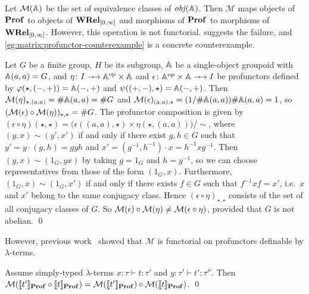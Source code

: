 Let \( \mathcal{M}(\mathbb{A}) \) be the set of equivalence classes of \( \mathit{obj}(\mathbb{A}) \). 
Then \( \mathcal{M} \) maps objects of \( \mathbf{Prof} \) to objects of \( \mathbf{WRel}_{[0,\infty]} \) and morphisms of \( \mathbf{Prof} \) to morphisms of \( \mathbf{WRel}_{[0,\infty]} \).
However, this operation is not functorial.
 suggests the failure, and \cref{eg:matrix:profunctor-counterexample} is a concrete counterexample.


\newcommand{\TerminalCategory}{I}
\begin{example}\label{eg:matrix:profunctor-counterexample}
    Let \( G \) be a finite group, \( H \) be its subgroup, \( \mathbb{A} \) be a single-object groupoid with \( \mathbb{A}(a, a) = G \), and \( \eta \colon \TerminalCategory \profarrow \Grp^{\op} \times \Grp \) and \( \epsilon \colon \Grp^{\op} \times \Grp \profarrow \TerminalCategory \) be profunctors defined by \( \varphi(\star, ({-}, {+})) = \mathbb{A}({-}, {+}) \) and \( \psi(({+}, {-}), \star) = \mathbb{A}({-}, {+}) \).
    Then \( \mathcal{M}({\eta})_{\star, (a,a)} = \#\mathbb{A}(a,a) = \#G \) and \( \mathcal{M}({\epsilon})_{(a,a), \star} = (1/\#\mathbb{A}(a,a))\#\mathbb{A}(a,a) = 1 \), so \( (\mathcal{M}({\epsilon}) \circ \mathcal{M}({\eta}))_{\star, \star} = \#G \).
    The profunctor composition is given by \( (\epsilon \circ \eta)(\star, \star) = \big( \epsilon((a,a), \star) \times \eta(\star, (a,a)) \big) / {\sim} \), where \( (y, x) \sim (y', x') \) if and only if there exist \( g, h \in G \) such that \( y' = y \cdot (g,h) = g y h \) and \( x' = (g^{-1}, h^{-1}) \cdot x = h^{-1} x g^{-1} \).
    Then \( (y, x) \sim (1_G, yx) \) by taking \( g = 1_G \) and \( h = y^{-1} \), so we can choose representatives from those of the form \( (1_G, x) \).
    Furthermore, \( (1_G, x) \sim (1_G, x') \) if and only if there exists \( f \in G \) such that \( f^{-1} x f = x' \), i.e.~\( x \) and \( x' \) belong to the same conjugacy class.
    Hence \( (\epsilon \circ \eta)_{\star, \star} \) consists of the set of all conjugacy classes of \( G \).
    So \( \mathcal{M}({\epsilon}) \circ \mathcal{M}({\eta}) \neq \mathcal{M}({\epsilon \circ \eta}) \), provided that \( G \) is not abelian.
    \qed
\end{example}

However, previous work~\cite{Tsukada2018,Clairambault} showed that \( \mathcal{M} \) is functorial on profunctors definable by \( \lambda \)-terms.
\begin{theorem}
    Assume simply-typed \( \lambda \)-terms \( x \colon \tau \vdash t \colon \tau' \) and \( y \colon \tau' \vdash t' \colon \tau'' \).
    Then \( \mathcal{M}({\llbracket{t'}\rrbracket_{\mathbf{Prof}} \circ \llbracket{t}\rrbracket_{\mathbf{Prof}}}) = \mathcal{M}({\llbracket{t'}\rrbracket_{\mathbf{Prof}}}) \circ \mathcal{M}({\llbracket{t}\rrbracket_{\mathbf{Prof}}}) \).
    \qed
\end{theorem}

